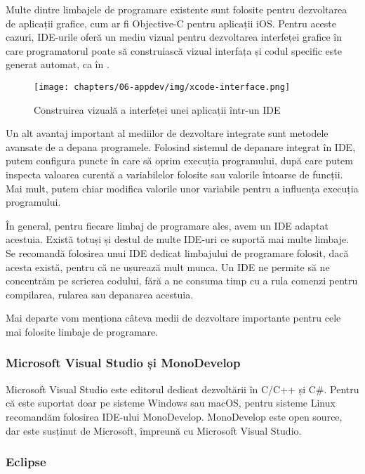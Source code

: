 Multe dintre limbajele de programare existente sunt folosite pentru dezvoltarea de
aplicații grafice, cum ar fi Objective-C pentru aplicații iOS. Pentru aceste
cazuri, IDE-urile oferă un mediu vizual pentru dezvoltarea interfeței grafice în
care programatorul poate să construiască vizual interfața și codul specific este
generat automat, ca în .

\begin{figure}[!htbp]
  \centering
  \texttt{[image: chapters/06-appdev/img/xcode-interface.png]}
  \caption{Construirea vizuală a interfeței unei aplicații într-un IDE}
  \label{fig:appdev:gui-interface}
\end{figure}

Un alt avantaj important al mediilor de dezvoltare integrate sunt metodele
avansate de a depana programele. Folosind sistemul de depanare integrat în IDE,
putem configura puncte în care să oprim execuția programului, după care putem
inspecta valoarea curentă a variabilelor folosite sau valorile întoarse de
funcții. Mai mult, putem chiar modifica valorile unor variabile pentru a
influența execuția programului.

În general, pentru fiecare limbaj de programare ales, avem un IDE adaptat
acestuia. Există totuși și destul de multe IDE-uri ce suportă mai multe limbaje.
Se recomandă folosirea unui IDE dedicat limbajului de programare folosit, dacă
acesta există, pentru că ne ușurează mult munca. Un IDE ne permite să ne
concentrăm pe scrierea codului, fără a ne consuma timp cu a rula comenzi pentru
compilarea, rularea sau depanarea acestuia.

Mai departe vom menționa câteva medii de dezvoltare importante pentru cele mai
folosite limbaje de programare.

\subsubsection{Microsoft Visual Studio și MonoDevelop}
\label{sec:appdev:dev:ide:mono}

Microsoft Visual Studio este editorul dedicat dezvoltării în C/C++ și C\#.
Pentru că este suportat doar pe sisteme Windows sau macOS, pentru sisteme Linux
recomandăm folosirea IDE-ului MonoDevelop. MonoDevelop este open source, dar
este susținut de Microsoft, împreună cu Microsoft Visual Studio.

\subsubsection{Eclipse}
\label{sec:appdev:dev:ide:eclipse}

